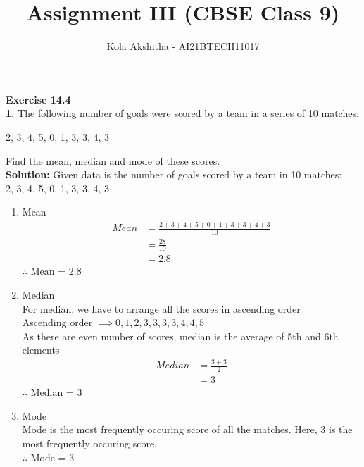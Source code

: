 \documentclass[journal,12pt,twocolumn]{IEEEtran}
\title{Assignment III (CBSE Class 9)}
\author{Kola Akshitha - AI21BTECH11017}
\begin{document}
\maketitle 
\textbf{Exercise 14.4} \\
\textbf{1.}
The following number of goals were scored by a team in a series of 10 matches: 
\begin{center}
2, 3, 4, 5, 0, 1, 3, 3, 4, 3  
\end{center}
Find the mean, median and mode of these scores. \\
\textbf{Solution:}
Given data is the number of goals scored by a team in 10 matches: \\
2, 3, 4, 5, 0, 1, 3, 3, 4, 3  
\begin{enumerate}[label=(\roman{enumi})]
\item Mean \\
\begin{align}
Mean &= \frac{2+3+4+5+0+1+3+3+4+3}{10} \nonumber\\
&= \frac{28}{10} \nonumber\\
&= 2.8 \nonumber
\end{align}
$\therefore$ Mean = 2.8 \\
\item Median \\
For median, we have to arrange all the scores in ascending order \\
Ascending order $\implies 0, 1, 2, 3, 3, 3, 3, 4, 4, 5$ \\
As there are even number of scores, median is the average of 5th and 6th elements \\
\begin{align}
Median &= \frac{3+3}{2} \nonumber\\
&= 3 \nonumber
\end{align}
$\therefore$ Median = 3 \\
\item Mode \\
Mode is the most frequently occuring score of all the matches.
Here, 3 is the most frequently occuring score. \\
$\therefore$ Mode = 3
\end{enumerate}
\end{document}
